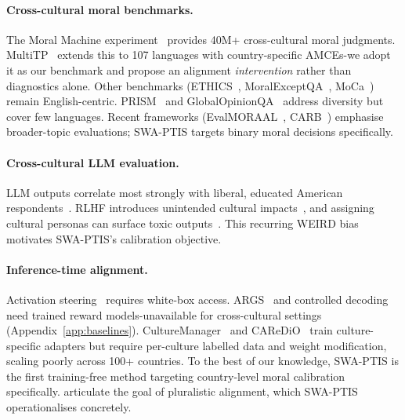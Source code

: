 \documentclass{article}
\begin{document}
\paragraph{Cross-cultural moral benchmarks.}
The Moral Machine experiment~\citep{awad2018moral} provides 40M+ cross-cultural moral
judgments. MultiTP~\citep{jin2025multitp} extends this to 107 languages with
country-specific AMCEs-we adopt it as our benchmark and propose an alignment
\emph{intervention} rather than diagnostics alone. Other benchmarks
(ETHICS~\citep{hendrycks2021aligning}, MoralExceptQA~\citep{jin2022exceptions},
MoCa~\citep{nie2023moca}) remain English-centric.
PRISM~\citep{kirk2024prism} and GlobalOpinionQA~\citep{durmus2023global} address
diversity but cover few languages. Recent frameworks
(EvalMORAAL~\citep{aakanksha2024evalmor}, CARB~\citep{myung2024carb}) emphasise
broader-topic evaluations; SWA-PTIS targets binary moral decisions specifically.

\paragraph{Cross-cultural LLM evaluation.}
LLM outputs correlate most strongly with liberal, educated American
respondents~\citep{santurkar2023opinions}. RLHF introduces unintended cultural
impacts~\citep{ryan2024unintended}, and assigning cultural personas can surface
toxic outputs~\citep{deshpande2023toxicity}. This recurring WEIRD bias motivates
SWA-PTIS's calibration objective.

\paragraph{Inference-time alignment.}
Activation steering~\citep{arditi2025refusal, zou2023representation} requires
white-box access. ARGS~\citep{khanov2024args} and controlled
decoding~\citep{mudgal2024controlled} need trained reward models-unavailable for
cross-cultural settings (Appendix~\ref{app:baselines}).
CultureManager~\citep{li2024culturemanager} and CAReDiO~\citep{yao2024caredio}
train culture-specific adapters but require per-culture labelled data and weight
modification, scaling poorly across 100+ countries. To the best of our knowledge,
SWA-PTIS is the first training-free method targeting country-level moral
calibration specifically.
\citet{sorensen2024roadmap} articulate the goal of pluralistic alignment, which
SWA-PTIS operationalises concretely.
\end{document}
